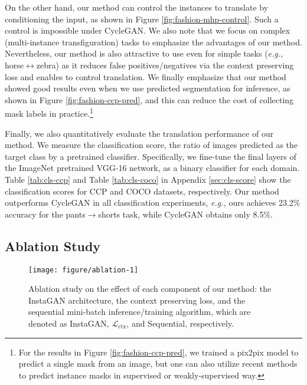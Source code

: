 \documentclass{article} \usepackage{iclr2019_conference,times}
\begin{document}
On the other hand, our method can control the instances to translate by conditioning the input, as shown in Figure \ref{fig:fashion-mhp-control}.
Such a control is impossible under
CycleGAN. We also note that we focus on complex (multi-instance transfiguration) tasks to emphasize the advantages of our method.
Nevertheless, our method is also attractive to use even for simple tasks (\textit{e.g.,} horse$\leftrightarrow$zebra)
as it reduces false positives/negatives via the context preserving loss and enables to control translation.
We finally emphasize that our method showed good results even when we use predicted segmentation for inference,
as shown in Figure \ref{fig:fashion-ccp-pred}, and this can reduce the cost of collecting mask labels in practice.\footnote{
For the results in Figure \ref{fig:fashion-ccp-pred}, we trained a pix2pix \citep{isola2017image} model to predict a single mask from an image,
but one can also utilize recent methods to predict instance masks
in supervised \citep{he2017mask} or weakly-supervised \citep{zhou2018weakly} way.}




Finally, we also quantitatively evaluate the translation performance of our method.
We measure the classification score, the ratio of images predicted as the target class by a pretrained classifier.
Specifically, we fine-tune the final layers of the
ImageNet \citep{deng2009imagenet} pretrained VGG-16 \citep{simonyan2014very} network,
as a binary classifier for each domain.
Table \ref{tab:cls-ccp} and Table \ref{tab:cls-coco} in Appendix \ref{sec:cls-score} show the classification scores
for CCP and COCO datasets, respectively.
Our method outperforms CycleGAN in all classification experiments,
\textit{e.g.,} ours achieves 23.2\% accuracy for the pants$\to$shorts task,
while CycleGAN obtains only 8.5\%.




\vspace{-0.025in}
\subsection{Ablation Study}
\label{sec:exp-ablation}
\vspace{-0.025in}

\begin{figure}[t]
\centering
	\texttt{[image: figure/ablation-1]}
	\caption{
	Ablation study on the effect of each component of our method: the InstaGAN architecture, the context preserving loss, and the sequential mini-batch inference/training algorithm,
	which are denoted as InstaGAN, $\mathcal{L}_\text{ctx}$, and Sequential, respectively.
} \label{fig:ablation-1}
\end{figure}	
\end{document}

